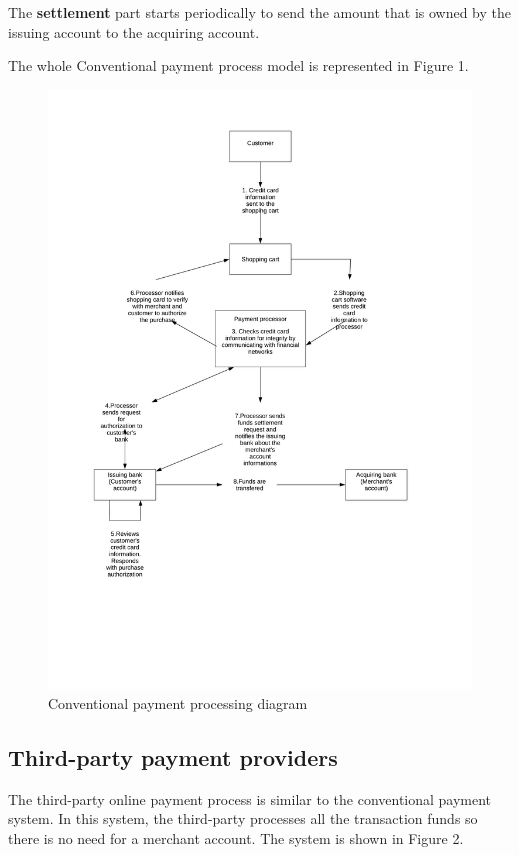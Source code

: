 \documentclass{ferseminar}
\begin{document}
The \textbf{settlement} part starts periodically to send the amount that is owned by the issuing account to the acquiring account. 

The whole Conventional payment process model is represented in Figure 1.

\begin{figure}[p]
	\caption{Conventional payment processing diagram}
	\includegraphics[scale=0.7]{diagram1}
	\centering
\end{figure}

\FloatBarrier

\subsection{Third-party payment providers}

The third-party online payment process is similar to the conventional payment system. In this system, the third-party processes all the transaction funds so there is no need for a merchant account. The system is shown in Figure 2. 
\end{document}
